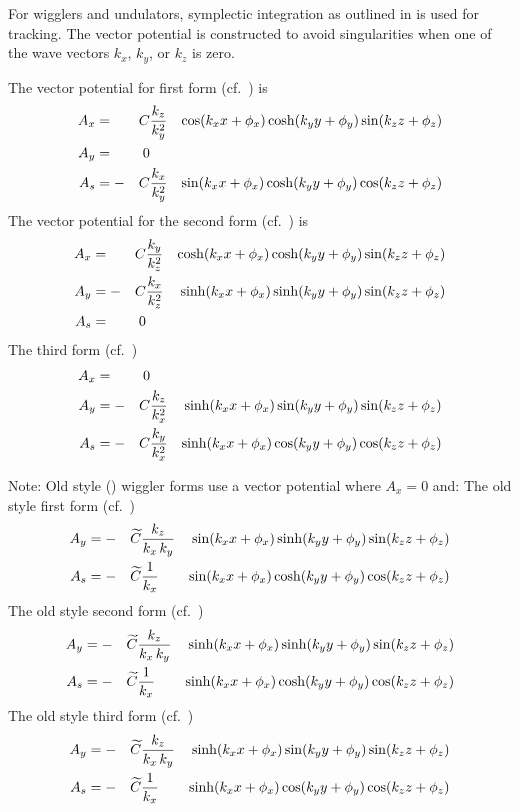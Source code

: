 For  wigglers and undulators, symplectic integration as
outlined in  is used for tracking. The vector
potential is constructed to avoid singularities when one of the wave
vectors $k_x$, $k_y$, or $k_z$ is zero. 

The vector potential for first form (cf.~) is
\begin{alignat}{4}
  A_x &=  &C &\dfrac{k_z}{k_y^2} & \cos(k_{x} x + \phi_x) \cosh(k_{y} y + \phi_y) \sin(k_{z} z + \phi_z) \label{af1} \nonumber \\
  A_y &=  &0 && \\
  A_s &= -&C &\dfrac{k_x}{k_y^2} & \sin(k_{x} x + \phi_x) \cosh(k_{y} y + \phi_y) \cos(k_{z} z + \phi_z) \nonumber
\end{alignat}
The vector potential for the second form (cf.~) is
\begin{alignat}{4}
  A_x &=  &C &\dfrac{k_y}{k_z^2} & \cosh(k_{x} x + \phi_x) \cosh(k_{y} y + \phi_y) \sin(k_{z} z + \phi_z) \nonumber \\
  A_y &= -&C &\dfrac{k_x}{k_z^2} & \sinh(k_{x} x + \phi_x) \sinh(k_{y} y + \phi_y) \sin(k_{z} z + \phi_z) \label{af2} \\
  A_s &=  &0 && \nonumber
\end{alignat}
The third form (cf.~)
\begin{alignat}{4}
  A_x &=  &0 &&\nonumber \\
  A_y &= -&C &\dfrac{k_z}{k_x^2} & \sinh(k_{x} x + \phi_x) \sin(k_{y} y + \phi_y) \sin(k_{z} z + \phi_z) \label{af3} \\
  A_s &= -&C &\dfrac{k_y}{k_x^2} & \sinh(k_{x} x + \phi_x) \cos(k_{y} y + \phi_y) \cos(k_{z} z + \phi_z) \nonumber
\end{alignat}

Note: Old style () wiggler forms use a vector
potential where $A_x = 0$ and:
The old style first form (cf.~)
\begin{alignat}{4}
  A_y &= -&\widetilde C &\dfrac{k_z}{k_x \, k_y} & \sin(k_{x} x + \phi_x) \sinh(k_{y} y + \phi_y) \sin(k_{z} z + \phi_z) \label{f1} \nonumber \\
  A_s &= -&\widetilde C &\dfrac{1}{k_x}          & \sin(k_{x} x + \phi_x) \cosh(k_{y} y + \phi_y) \cos(k_{z} z + \phi_z) 
\end{alignat}
The old style second form (cf.~)
\begin{alignat}{4}
  A_y &= -&\widetilde C &\dfrac{k_z}{k_x \, k_y} & \sinh(k_{x} x + \phi_x) \sinh(k_{y} y + \phi_y) \sin(k_{z} z + \phi_z) \label{f2} \nonumber \\
  A_s &= -&\widetilde C &\dfrac{1}{k_x}          & \sinh(k_{x} x + \phi_x) \cosh(k_{y} y + \phi_y) \cos(k_{z} z + \phi_z) 
\end{alignat}
The old style third form (cf.~)
\begin{alignat}{4}
  A_y &= -&\widetilde C &\dfrac{k_z}{k_x \, k_y} & \sinh(k_{x} x + \phi_x) \sin(k_{y} y + \phi_y) \sin(k_{z} z + \phi_z) \label{f3} \nonumber \\
  A_s &= -&\widetilde C &\dfrac{1}{k_x}          & \sinh(k_{x} x + \phi_x) \cos(k_{y} y + \phi_y) \cos(k_{z} z + \phi_z) 
\end{alignat}

